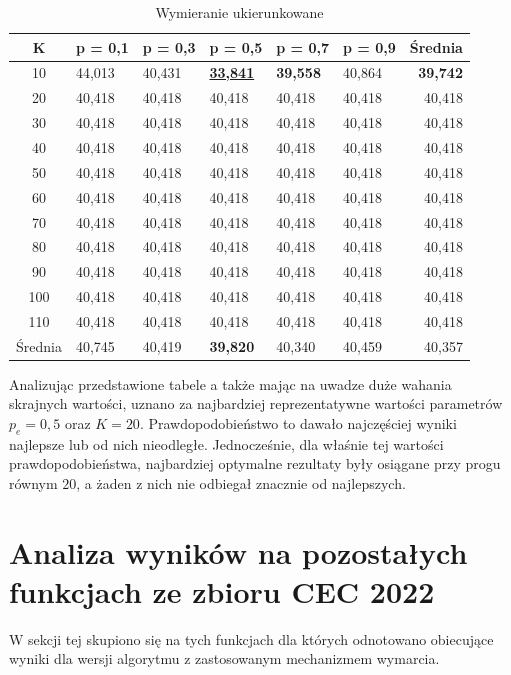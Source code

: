 \documentclass[10pt]{article}
\begin{document}
\begin{table}[H]
\begin{subtable}{\textwidth}
\centering
\begin{tabularx}{0.8\textwidth}{c||X|X|X|X|X||r}
\hline
K & p = 0,1 & p = 0,3 & p = 0,5 & p = 0,7 & p = 0,9 & Średnia \\
\hline \hline
10 & 44,013 & 40,431 & \underline{\textbf{33,841}} & \textbf{39,558} & 40,864 & \textbf{39,742} \\
20 & 40,418 & 40,418 & 40,418 & 40,418 & 40,418 & 40,418 \\
30 & 40,418 & 40,418 & 40,418 & 40,418 & 40,418 & 40,418 \\
40 & 40,418 & 40,418 & 40,418 & 40,418 & 40,418 & 40,418 \\
50 & 40,418 & 40,418 & 40,418 & 40,418 & 40,418 & 40,418 \\
60 & 40,418 & 40,418 & 40,418 & 40,418 & 40,418 & 40,418 \\
70 & 40,418 & 40,418 & 40,418 & 40,418 & 40,418 & 40,418 \\
80 & 40,418 & 40,418 & 40,418 & 40,418 & 40,418 & 40,418 \\
90 & 40,418 & 40,418 & 40,418 & 40,418 & 40,418 & 40,418 \\
100 & 40,418 & 40,418 & 40,418 & 40,418 & 40,418 & 40,418 \\
110 & 40,418 & 40,418 & 40,418 & 40,418 & 40,418 & 40,418 \\
\hline
Średnia & 40,745 & 40,419 & \textbf{39,820} & 40,340 & 40,459 & 40,357 \\
\hline
\end{tabularx}
\caption{Wymieranie ukierunkowane}
\end{subtable}
\end{table}

Analizując przedstawione tabele a także mając na uwadze duże wahania skrajnych wartości, uznano za najbardziej reprezentatywne wartości parametrów $p_e = 0,5$ oraz $K = 20$. Prawdopodobieństwo to dawało najczęściej wyniki najlepsze lub od nich nieodległe. Jednocześnie, dla właśnie tej wartości prawdopodobieństwa, najbardziej optymalne rezultaty były osiągane przy progu równym $20$, a żaden z nich nie odbiegał znacznie od najlepszych. 
\section{Analiza wyników na pozostałych funkcjach ze zbioru CEC 2022}
W sekcji tej skupiono się na tych funkcjach dla których odnotowano obiecujące wyniki dla wersji algorytmu z zastosowanym mechanizmem wymarcia.
\end{document}
